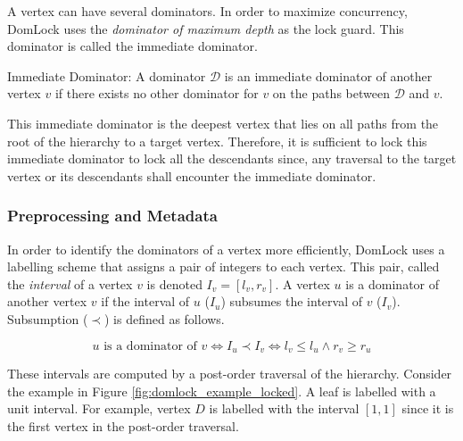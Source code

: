 A vertex can have several dominators. 
In order to maximize concurrency, DomLock uses the \emph{dominator of maximum depth} as the lock guard. This dominator is called the immediate dominator. 




\begin{definition}
    Immediate Dominator: A dominator $\mathcal{D}$ is an immediate dominator of another vertex $v$ if there exists no other dominator for $v$ on the paths between $\mathcal{D}$ and $v$.
\end{definition}

This immediate dominator is the deepest vertex that lies on all paths from the root of the hierarchy to a target vertex. Therefore, it is sufficient to lock this immediate dominator to lock all the descendants since, any traversal to the target vertex or its descendants shall encounter the immediate dominator.

\subsubsection{Preprocessing and Metadata}

In order to identify the dominators of a vertex more efficiently, DomLock uses a labelling scheme that assigns a pair of integers to each vertex. This pair, called the \emph{interval} of a vertex $v$ is denoted  $I_v = [l_v, r_v]$. 
A vertex $u$ is a dominator of another vertex $v$ if the interval of $u$ ($I_u$) subsumes the interval of $v$ ($I_v$). Subsumption ($\prec$) is defined as follows.


\begin{equation}
    u \text{ is a dominator of } v \iff I_u \prec I_v \iff l_v \leq l_u \land r_v \geq r_u
\end{equation}


These intervals are computed by a post-order traversal of the hierarchy. Consider the example in Figure \ref{fig:domlock_example_locked}. A leaf is labelled with a unit interval. For example, vertex $D$ is labelled with the interval $[1, 1]$ since it is the first vertex in the post-order traversal.  


